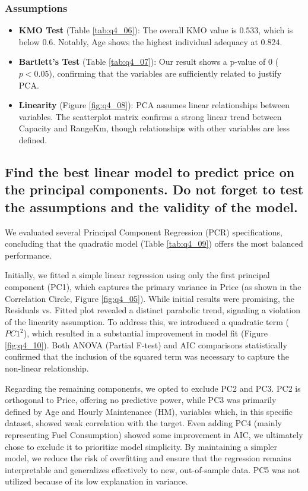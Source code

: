\subsubsection*{Assumptions}

\begin{itemize}
    \item \textbf{KMO Test} (Table \ref{tab:q4_06}): The overall KMO value is 0.533, which is below 0.6. Notably, Age shows the highest individual adequacy at 0.824.
    \item \textbf{Bartlett's Test} (Table \ref{tab:q4_07}): Our result shows a p-value of 0 ($p < 0.05$), confirming that the variables are sufficiently related to justify PCA.
    \item \textbf{Linearity} (Figure \ref{fig:q4_08}): PCA assumes linear relationships between variables. The scatterplot matrix confirms a strong linear trend between Capacity and RangeKm, though relationships with other variables are less defined.
\end{itemize}

\subsection[Q4-b]{Find the best linear model to predict price on the principal components. Do not forget to test the assumptions and the validity of the model.}

We evaluated several Principal Component Regression (PCR) specifications, concluding that the quadratic model (Table \ref{tab:q4_09}) offers the most balanced performance.

Initially, we fitted a simple linear regression using only the first principal component (PC1), which captures the primary variance in Price (as shown in the Correlation Circle, Figure \ref{fig:q4_05}). While initial results were promising, the Residuals vs. Fitted plot revealed a distinct parabolic trend, signaling a violation of the linearity assumption. To address this, we introduced a quadratic term ($PC1^2$), which resulted in a substantial improvement in model fit (Figure \ref{fig:q4_10}). Both ANOVA (Partial F-test) and AIC comparisons statistically confirmed that the inclusion of the squared term was necessary to capture the non-linear relationship.

Regarding the remaining components, we opted to exclude PC2 and PC3. PC2 is orthogonal to Price, offering no predictive power, while PC3 was primarily defined by Age and Hourly Maintenance (HM), variables which, in this specific dataset, showed weak correlation with the target. Even adding PC4 (mainly representing Fuel Consumption) showed some improvement in AIC, we ultimately chose to exclude it to prioritize model simplicity. By maintaining a simpler model, we reduce the risk of overfitting and ensure that the regression remains interpretable and generalizes effectively to new, out-of-sample data. PC5 was not utilized because of its low explanation in variance.

